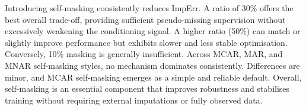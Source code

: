 \documentclass[times, review, 10pt]{elsarticle}
\begin{document}
Introducing self-masking consistently reduces ImpErr. A ratio of 30\% offers the best
overall trade-off, providing sufficient pseudo-missing supervision without excessively
weakening the conditioning signal. A higher ratio (50\%) can match or slightly improve
performance but exhibits slower and less stable optimisation. Conversely, 10\%
masking is generally insufficient. Across MCAR, MAR, and MNAR self-masking styles, no mechanism dominates
consistently. Differences are minor, and MCAR self-masking emerges as a simple and
reliable default. Overall, self-masking is an essential component that improves
robustness and stabilises training without requiring external imputations or fully
observed data.




\end{document}
